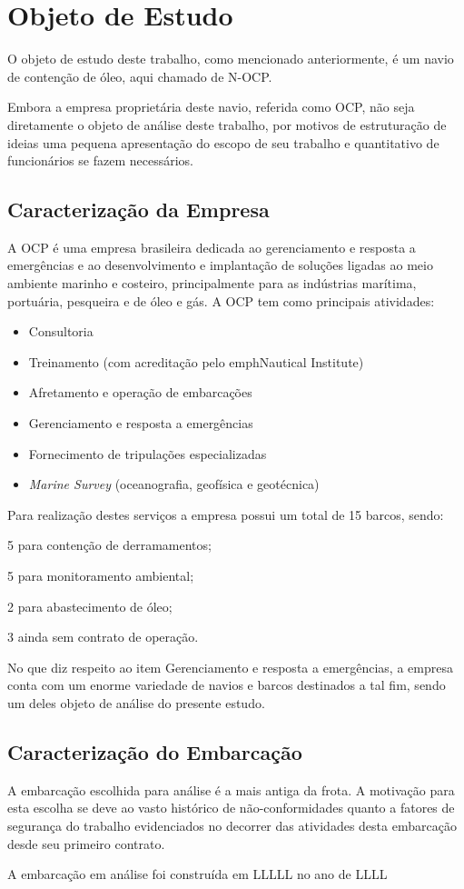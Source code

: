 \chapter{Objeto de Estudo}
O objeto de estudo deste trabalho, como mencionado anteriormente, é um navio de contenção de óleo, aqui chamado de N-OCP. 

Embora a empresa proprietária deste navio, referida como OCP, não seja diretamente o objeto de análise deste trabalho, por motivos de estruturação de ideias uma pequena apresentação do escopo de seu trabalho e quantitativo de funcionários se fazem necessários.

\section{Caracterização da Empresa}
A OCP é uma empresa brasileira dedicada ao gerenciamento e resposta a emergências e ao desenvolvimento e implantação de soluções ligadas ao meio ambiente marinho e costeiro, principalmente para as indústrias marítima, portuária, pesqueira e de óleo e gás.
A OCP tem como principais atividades:
\begin{itemize}
\item Consultoria
\item Treinamento (com acreditação pelo emph{Nautical Institute})
\item Afretamento e operação de embarcações
\item Gerenciamento e resposta a emergências
\item Fornecimento de tripulações especializadas
\item \emph{Marine Survey} (oceanografia, geofísica e geotécnica)
\end{itemize}

Para realização destes serviços a empresa possui um total de 15 barcos, sendo:
\item 5 para contenção de derramamentos;
\item 5 para monitoramento ambiental;
\item 2 para abastecimento de óleo;
\item 3 ainda sem contrato de operação.

No que diz respeito ao item Gerenciamento e resposta a emergências, a empresa conta com um enorme variedade de navios e barcos destinados a tal fim, sendo um deles objeto de análise do presente estudo.

\section{Caracterização do Embarcação}
A embarcação escolhida para análise é a mais antiga da frota. A motivação para esta escolha se deve ao vasto histórico de não-conformidades quanto a fatores de segurança do trabalho evidenciados no decorrer das atividades desta embarcação desde seu primeiro contrato.

A embarcação em análise foi construída em LLLLL no ano de LLLL